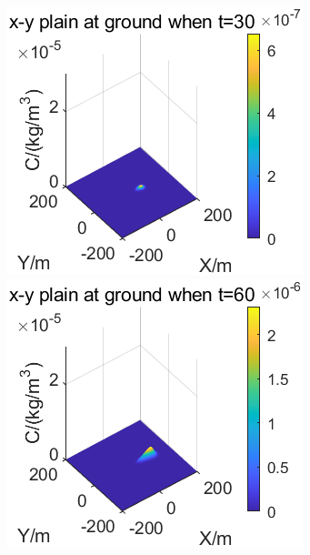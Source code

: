 \documentclass{article}
\begin{document}
	\begin{figure}[htbp]
		\begin{minipage}{0.33\textwidth}
			\includegraphics[width=\textwidth]{pics/v=2,t=30.png}
		\end{minipage}
		\begin{minipage}{0.33\textwidth}
			\includegraphics[width=\textwidth]{pics/v=2,t=60.png}
		\end{minipage}

\end{figure}
\end{document}
